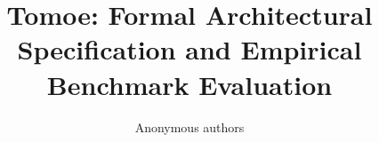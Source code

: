 \title{\textbf{Tomoe: Formal Architectural Specification and Empirical Benchmark Evaluation}}

\author{Anonymous authors}
